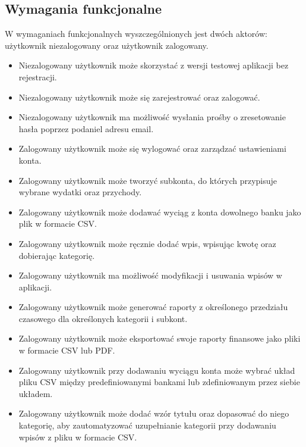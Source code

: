 \documentclass{article}
\begin{document}
	\subsection{Wymagania funkcjonalne}
	W wymaganiach funkcjonalnych wyszczególnionych jest dwóch aktorów: użytkownik niezalogowany oraz użytkownik zalogowany.
	\begin{itemize}
		\item Niezalogowany użytkownik może skorzystać z wersji testowej aplikacji bez rejestracji.
		\item Niezalogowany użytkownik może się zarejestrować oraz zalogować.
		\item Niezalogowany użytkownik ma możliwość wysłania prośby o zresetowanie hasła poprzez podaniel adresu email.
		\item Zalogowany użytkownik może się wylogować oraz zarządzać ustawieniami konta.
		\item Zalogowany użytkownik może tworzyć subkonta, do których przypisuje wybrane wydatki oraz przychody.
		\item Zalogowany użytkownik może dodawać wyciąg z konta dowolnego banku jako plik w formacie CSV.
		\item Zalogowany użytkownik może ręcznie dodać wpis, wpisując kwotę oraz dobierając kategorię.
		\item Zalogowany użytkownik ma możliwość modyfikacji i usuwania wpisów w aplikacji.
		\item Zalogowany użytkownik może generować raporty z określonego przedziału czasowego dla określonych kategorii i subkont.
		\item Zalogowany użytkownik może eksportować swoje raporty finansowe jako pliki w formacie CSV lub PDF.
		\item Zalogowany użytkownik przy dodawaniu wyciągu konta może wybrać układ pliku CSV między predefiniowanymi bankami lub zdefiniowanym przez siebie układem.
		\item Zalogowany użytkownik może dodać wzór tytułu oraz dopasować do niego kategorię, aby zautomatyzować uzupełnianie kategorii przy dodawaniu wpisów z pliku w formacie CSV.
		
	\end{itemize}
\end{document}
